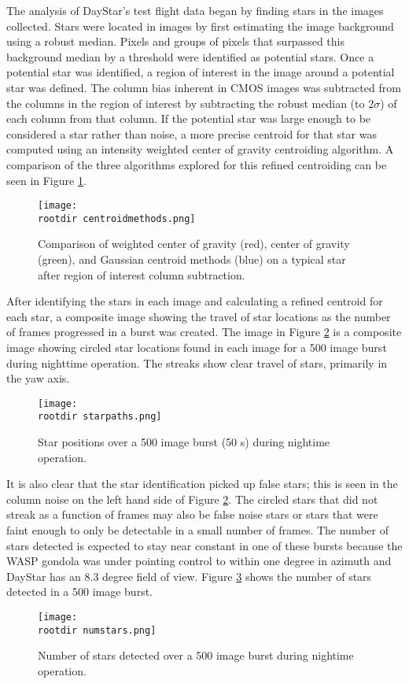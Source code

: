 \documentclass[twocolumn,letterpaper]{IEEEAerospace2012}
\newcommand{\rootdir}{./Figures/}
\begin{document}
The analysis of DayStar's test flight data began by finding stars in the images collected. Stars were located in images by first estimating the image background using a robust median. Pixels and groups of pixels that surpassed this background median by a threshold were identified as potential stars. Once a potential star was identified, a region of interest in the image around a potential star was defined. The column bias inherent in CMOS images was subtracted from the columns in the region of interest by subtracting the robust median (to $2\sigma$) of each column from that column. If the potential star was large enough to be considered a star rather than noise, a more precise centroid for that star was computed using an intensity weighted center of gravity centroiding algorithm. A comparison of the three algorithms explored for this refined centroiding can be seen in Figure \ref{fig:centroidmethods}.
\begin{figure}[H]
    \centering
    \texttt{[image: \\rootdir centroidmethods.png]}
    \caption{Comparison of weighted center of gravity (red), center of gravity (green), and Gaussian centroid methods (blue) on a typical star after region of interest column subtraction.}
    \label{fig:centroidmethods}
\end{figure}

After identifying the stars in each image and calculating a refined centroid for each star, a composite image showing the travel of star locations as the number of frames progressed in a burst was created. The image in Figure \ref{fig:starpaths} is a composite image showing circled star locations found in each image for a 500 image burst during nighttime operation. The streaks show clear travel of stars, primarily in the yaw axis.
\begin{figure}[H]
    \centering
    \texttt{[image: \\rootdir starpaths.png]}
    \caption{Star positions over a 500 image burst (50 s) during nightime operation.}
    \label{fig:starpaths}
\end{figure}

It is also clear that the star identification picked up false stars; this is seen in the column noise on the left hand side of Figure \ref{fig:starpaths}. The circled stars that did not streak as a function of frames may also be false noise stars or stars that were faint enough to only be detectable in a small number of frames. The number of stars detected is expected to stay near constant in one of these bursts because the WASP gondola was under pointing control to within one degree in azimuth and DayStar has an 8.3 degree field of view. Figure \ref{fig:numstars} shows the number of stars detected in a 500 image burst.
\begin{figure}[H]
    \centering
    \texttt{[image: \\rootdir numstars.png]}
    \caption{Number of stars detected over a 500 image burst during nightime operation.}
    \label{fig:numstars}
\end{figure}
\end{document}
